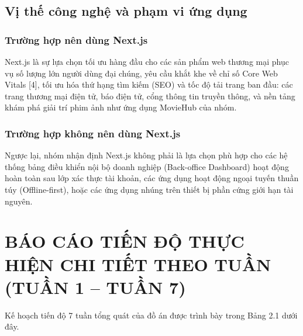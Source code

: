 \documentclass[13pt,a4paper]{extarticle}
\begin{document}
\subsection{Vị thế công nghệ và phạm vi ứng dụng}

\subsubsection{Trường hợp nên dùng Next.js}
Next.js là sự lựa chọn tối ưu hàng đầu cho các sản phẩm web thương mại phục vụ số lượng lớn người dùng đại chúng, yêu cầu khắt khe về chỉ số Core Web Vitals [4], tối ưu hóa thứ hạng tìm kiếm (SEO) và tốc độ tải trang ban đầu: các trang thương mại điện tử, báo điện tử, cổng thông tin truyền thông, và nền tảng khám phá giải trí phim ảnh như ứng dụng MovieHub của nhóm.

\subsubsection{Trường hợp không nên dùng Next.js}
Ngược lại, nhóm nhận định Next.js không phải là lựa chọn phù hợp cho các hệ thống bảng điều khiển nội bộ doanh nghiệp (Back-office Dashboard) hoạt động hoàn toàn sau lớp xác thực tài khoản, các ứng dụng hoạt động ngoại tuyến thuần túy (Offline-first), hoặc các ứng dụng nhúng trên thiết bị phần cứng giới hạn tài nguyên.

\newpage
\section{BÁO CÁO TIẾN ĐỘ THỰC HIỆN CHI TIẾT THEO TUẦN (TUẦN 1 -- TUẦN 7)}

Kế hoạch tiến độ 7 tuần tổng quát của đồ án được trình bày trong Bảng 2.1 dưới đây.
\end{document}
